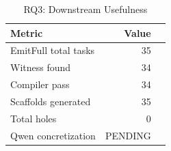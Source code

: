 \begin{table}[t]
\centering
\caption{RQ3: Downstream Usefulness}
\label{tab:rq3_downstream}
\begin{tabular}{lrr}
\toprule
Metric & Value \\
\midrule
EmitFull total tasks & 35 \\
Witness found & 34 \\
Compiler pass & 34 \\
Scaffolds generated & 35 \\
Total holes & 0 \\
Qwen concretization & PENDING \\
\bottomrule
\end{tabular}
\end{table}
